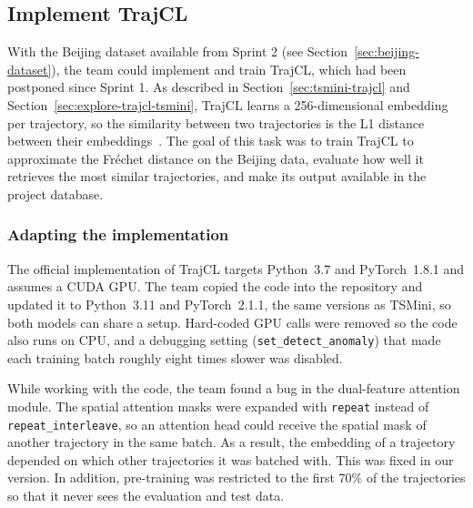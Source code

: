 %
%

\subsection{Implement TrajCL}
\label{sec:sprint3-trajcl}

With the Beijing dataset available from Sprint 2 (see Section~\ref{sec:beijing-dataset}), the team could implement and train TrajCL, which had been postponed since Sprint 1. As described in Section~\ref{sec:tsmini-trajcl} and Section~\ref{sec:explore-trajcl-tsmini}, TrajCL learns a 256-dimensional embedding per trajectory, so the similarity between two trajectories is the L1 distance between their embeddings~\cite{trajcl}. The goal of this task was to train TrajCL to approximate the Fréchet distance on the Beijing data, evaluate how well it retrieves the most similar trajectories, and make its output available in the project database.

\subsubsection*{Adapting the implementation}

The official implementation of TrajCL targets Python~3.7 and PyTorch~1.8.1 and assumes a CUDA GPU. The team copied the code into the repository and updated it to Python~3.11 and PyTorch~2.1.1, the same versions as TSMini, so both models can share a setup. Hard-coded GPU calls were removed so the code also runs on CPU, and a debugging setting (\texttt{set\_detect\_anomaly}) that made each training batch roughly eight times slower was disabled.

While working with the code, the team found a bug in the dual-feature attention module. The spatial attention masks were expanded with \texttt{repeat} instead of \texttt{repeat\_interleave}, so an attention head could receive the spatial mask of another trajectory in the same batch. As a result, the embedding of a trajectory depended on which other trajectories it was batched with. This was fixed in our version. In addition, pre-training was restricted to the first 70\% of the trajectories so that it never sees the evaluation and test data.

